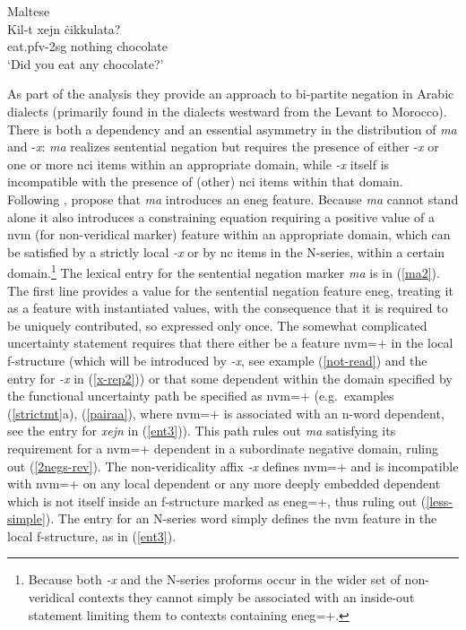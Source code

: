 \documentclass[output=paper,hidelinks]{langscibook}
\begin{document}
\ea\label{question} Maltese \citep[154]{camilleri-sadler:2017} \\
\gll Kil-t xejn {\.c}ikkulata?\\
eat.{\sc pfv-2sg} nothing chocolate\\
\glt `Did you eat any chocolate?'
\z





As part of the analysis they provide an approach to bi-partite negation in Arabic dialects (primarily found in the dialects westward from the Levant to Morocco).
There is both a  dependency and an essential
asymmetry in the distribution of \emph{ma} and -\emph{{x}}:  \emph{ma}
realizes sentential negation but requires the presence of either
-\emph{x} or one or more {\sc nci} items within an appropriate domain, while {\em -x} itself is incompatible with the presence of (other) {\sc nci} items within that domain.  Following \citet{przepiorkowski2015two}, \citet{camilleri-sadler:2017} propose that {\em ma}  introduces an {\sc eneg} feature. Because {\em ma}  cannot stand alone  it also introduces a constraining equation requiring a positive value of a {\sc nvm} (for non-veridical marker) feature within an appropriate domain, which can be satisfied by a strictly local  {\em -x} or by {\sc nc} items in the N-series, within a certain domain.\footnote{Because both {\em -x} and the N-series proforms occur in the wider set of non-veridical contexts they cannot simply be associated with an inside-out statement limiting them to contexts containing {\sc eneg}=+.}
The lexical entry  for the sentential negation marker {\em ma} is in (\ref{ma2}). The first line provides a value for the sentential negation feature {\sc eneg}, treating it as a feature with instantiated values, with the consequence that it is required to be uniquely contributed, so expressed only once. The somewhat complicated uncertainty statement requires that there either be a feature {\sc nvm}=+ in the local f-structure  (which will be introduced by {\em -x}, see example (\ref{not-read}) and the entry for {\em -x} in (\ref{x-rep2}))
or that some dependent within the domain specified by the functional uncertainty path be specified as {\sc nvm}=+  (e.g.\ examples (\ref{strictmt}a), (\ref{pairaa}), where {\sc nvm}=+ is associated with an n-word  dependent, see the entry for {\em xejn} in (\ref{ent3})).  This path rules out {\em ma} satisfying its requirement for a {\sc nvm}=+ dependent in a subordinate negative domain, ruling out (\ref{2negs-rev}).
The non-veridicality affix {\em -x} defines {\sc nvm}=+ and is incompatible with {\sc nvm}=+ on any local  dependent or any more deeply embedded dependent which is not itself inside an f-structure marked as {\sc eneg}=+, thus ruling out (\ref{less-simple}). The entry for an N-series word simply defines the {\sc nvm}  feature in the local f-structure, as in (\ref{ent3}).
\end{document}
